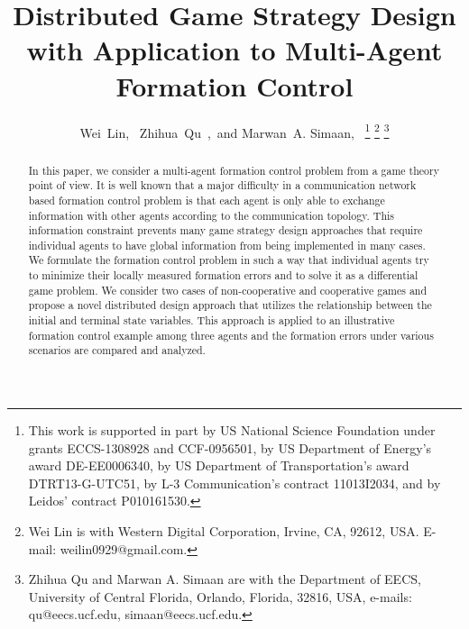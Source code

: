 \documentclass[12pt,draftcls,onecolumn]{IEEEtran}  %
\begin{document}
\title{\LARGE \bf
Distributed Game Strategy Design with Application to Multi-Agent Formation Control}


\author{Wei~Lin,~
        Zhihua~Qu~,~and
        Marwan~A. Simaan,~
\thanks{This work is supported in part by US National Science Foundation under grants ECCS-1308928 and CCF-0956501, by US Department of Energy’s award DE-EE0006340, by US Department of Transportation’s award DTRT13-G-UTC51, by L-3 Communication’s contract 11013I2034, and by Leidos’ contract P010161530.}%
\thanks{Wei Lin is with Western Digital Corporation, Irvine, CA, 92612, USA. E-mail: weilin0929@gmail.com.}
\thanks{Zhihua Qu and Marwan A. Simaan are with the Department of EECS, University of Central Florida, Orlando, Florida, 32816, USA, e-mails: qu@eecs.ucf.edu, simaan@eecs.ucf.edu.}%
%
}



\maketitle

\IEEEpeerreviewmaketitle

\begin{abstract}
In this paper, we consider a multi-agent formation control problem from a game theory point of view. It is well known that a major difficulty in a communication network based formation control problem is that each agent is only able to exchange information with other agents according to the communication topology. This information constraint prevents many game strategy design approaches that require individual agents to have global information from being implemented in many cases. We formulate the formation control problem in such a way that individual agents try to minimize their locally measured formation errors and to solve it as a differential game problem. We consider two cases of non-cooperative and cooperative games and propose a novel distributed design approach that utilizes the relationship between the initial and terminal state variables. This approach is applied to an illustrative formation control example among three agents and the formation errors under various scenarios are compared and analyzed.
\end{abstract}
\end{document}
